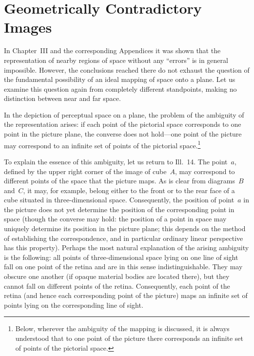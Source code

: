 
\chapter{Geometrically Contradictory Images}



In Chapter~III and the corresponding Appendices it was shown that the representation of
nearby regions of space without any ``errors'' is in general impossible.  However, the
conclusions reached there do not exhaust the question of the fundamental possibility of
an ideal mapping of space onto a plane.  Let us examine this question again from
completely different standpoints, making no distinction between near and far space.

In the depiction of perceptual space on a plane, the problem of the ambiguity of the
representation arises: if each point of the pictorial space corresponds to one point in
the picture plane, the converse does not hold---one point of the picture may correspond
to an infinite set of points of the pictorial space.\footnote{Below, wherever the
  ambiguity of the mapping is discussed, it is always understood that to one point of
  the picture there corresponds an infinite set of points of the pictorial space.}

To explain the essence of this ambiguity, let us return to Ill.~14.  The point~$a$,
defined by the upper right corner of the image of cube~$A$, may correspond to different
points of the space that the picture maps.  As is clear from diagrams~$B$ and~$C$, it
may, for example, belong either to the front or to the rear face of a cube situated in
three-dimensional space.  Consequently, the position of point~$a$ in the picture does
not yet determine the position of the corresponding point in space (though the converse
may hold: the position of a point in space may uniquely determine its position in the
picture plane; this depends on the method of establishing the correspondence, and in
particular ordinary linear perspective has this property).  Perhaps the most natural
explanation of the arising ambiguity is the following: all points of three-dimensional
space lying on one line of sight fall on one point of the retina and are in this sense
indistinguishable.  They may obscure one another (if opaque material bodies are located
there), but they cannot fall on different points of the retina.  Consequently, each
point of the retina (and hence each corresponding point of the picture) maps an infinite
set of points lying on the corresponding line of sight.

